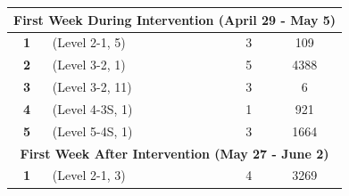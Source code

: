 \begin{table}[t]
\begin{tabular}{clcc}
\multicolumn{4}{c}{\cellcolor[HTML]{ECF4FF}\textbf{First Week During Intervention (April 29 - May 5)}}                                                                                                                                                                      \\ \hline
\textbf{1}             & (Level 2-1, 5)                                                                      & 3                                                                           & 109                                                                                     \\ \hline
\textbf{2}             & (Level 3-2, 1)                                                                      & 5                                                                           & 4388                                                                                    \\ \hline
\textbf{3}             & (Level 3-2, 11)                                                                     & 3                                                                           & 6                                                                                       \\ \hline
\textbf{4}             & (Level 4-3S, 1)                                                                      & 1                                                                           & 921                                                                                     \\ \hline
\textbf{5}             & (Level 5-4S, 1)                                                                      & 3                                                                           & 1664                                                                                    \\ \hline
\multicolumn{4}{c}{\cellcolor[HTML]{ECF4FF}\textbf{First Week After Intervention (May 27 - June 2)}}                                                                                                                                                                        \\ \hline
\textbf{1}             & (Level 2-1, 3)                                                                      & 4                                                                           & 3269                                                                                    \\ \hline

\end{tabular}
\end{table}
